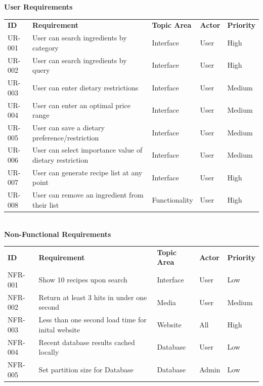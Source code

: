 \documentclass[12pt]{article}
\begin{document}
\begin{center}
 \textbf{User Requirements} \\
\begin{tabular}{ l  l  l  l  l  }
  \textbf{ID}  & \textbf{Requirement} & \textbf{Topic Area} & \textbf{Actor} & \textbf{Priority} \\  \rowcolor[gray]{.95}  \hline
  UR-001 & User can search ingredients by category & Interface & User & High \\  
  UR-002 & User can search ingredients by query & Interface & User & High \\  \rowcolor[gray]{.95}
  UR-003 & User can enter dietary restrictions & Interface & User & Medium \\  
  UR-004 & User can enter an optimal price range & Interface & User & Medium \\  \rowcolor[gray]{.95}
  UR-005 & User can save a dietary preference/restriction & Interface & User & Medium \\ 
  UR-006 & User can select importance value of dietary restriction & Interface & User & Medium \\ \rowcolor[gray]{.95}
  UR-007 & User can generate recipe list at any point & Interface & User & High \\
  UR-008 & User can remove an ingredient from their list & Functionality & User & High \\
\end{tabular}
\\
  \vspace{1cm}
  \textbf{Non-Functional Requirements}
\begin{tabular}{ l  l  l  l  l  }
  \hline
  \textbf{ID}  & \textbf{Requirement} & \textbf{Topic Area} & \textbf{Actor} & \textbf{Priority} \\  \rowcolor[gray]{.95}
  NFR-001 & Show 10 recipes upon search  &  Interface & User & Low  \\  
  NFR-002 & Return at least 3 hits in under one second & Media & User &  Medium\\  \rowcolor[gray]{.95}
  NFR-003 & Less than one second load time for inital website &  Website & All & High \\ 
  NFR-004 & Recent database results cached locally & Database & User & Low \\  \rowcolor[gray]{.95}
  NFR-005 & Set partition size for Database & Database & Admin & Low \\ 
\end{tabular}
\end{center}
\end{document}
